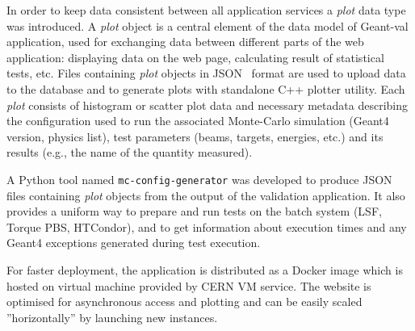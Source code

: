 In order to keep data consistent between all application services a \textit{plot} data type was introduced. A \textit{plot} object is a central element of the data model of \textsf{Geant-val} application, used for exchanging data between different parts of the web application: displaying data on the web page, calculating result of statistical tests, etc. Files containing \textit{plot} objects in JSON~\cite{json} format are used to upload data to the database and to generate plots with standalone C++ plotter utility.
Each \textit{plot} consists of histogram or scatter plot data and necessary metadata describing the configuration used to run the associated Monte-Carlo simulation (Geant4 version, physics list), test parameters (beams, targets, energies, etc.) and its results (e.g., the name of the quantity measured).

A Python tool named {\tt mc-config-generator} was developed to produce JSON files containing \textit{plot} objects from the output of the validation application. It also provides a uniform way to prepare and run tests on the batch system (LSF, Torque PBS, HTCondor), and to get information about execution times and any Geant4 exceptions generated during test execution.

For faster deployment, the application is distributed as a Docker image which is hosted on virtual machine provided by CERN VM service. The website is optimised for asynchronous access and plotting and can be easily scaled ''horizontally'' by launching new instances.%
